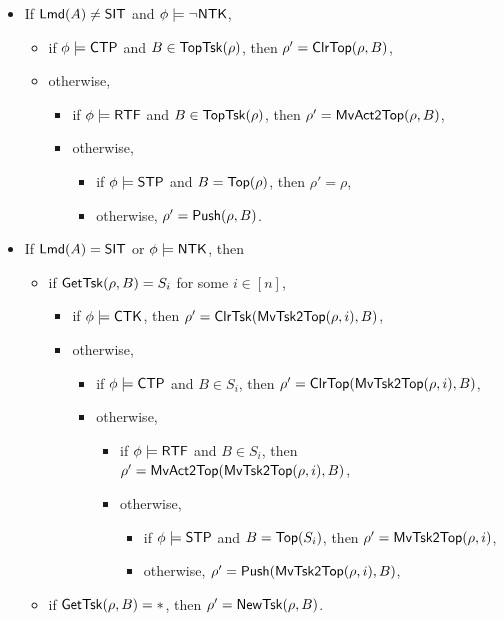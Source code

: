 \medskip

\noindent {}
\begin{itemize}
	\item If ${\sf Lmd}(A) \neq {\sf SIT}$ and $\phi \models \neg {\sf NTK}$, 
	\begin{itemize}
        \item if $\phi \models{\sf CTP}$ and $B \in \mathsf{TopTsk}(\rho)$, then $\rho' =\mathsf{ClrTop}(\rho, B)$,
		\item otherwise,
		\begin{itemize}
			\item if $\phi \models {\sf RTF}$ and $B \in \mathsf{TopTsk}(\rho)$, then $\rho'=\mathsf{MvAct2Top}(\rho, B)$,
			\item otherwise,
			\begin{itemize}
				\item if $\phi \models {\sf STP}$ and $B = \mathsf{Top}(\rho)$, then $\rho' = \rho$,
				\item otherwise, $\rho' = \mathsf{Push}(\rho, B)$.
			\end{itemize}
		\end{itemize}
	\end{itemize}
	\item If ${\sf Lmd}(A) = {\sf SIT}$ or $\phi \models {\sf NTK}$, then
	\begin{itemize}
		\item if $\mathsf{GetTsk}(\rho, B) = S_i$ for some $i\in[n]$,
		\begin{itemize}
            \item if $\phi \models{\sf CTK}$, then $\rho' = \mathsf{ClrTsk}(\mathsf{MvTsk2Top}(\rho, i), B)$,
			\item otherwise, 
			\begin{itemize}
				\item if $\phi \models{\sf CTP}$ and $B \in S_i$, then $\rho' =\mathsf{ClrTop}(\mathsf{MvTsk2Top}(\rho, i), B)$,
				\item otherwise,
				\begin{itemize}
					\item if $\phi \models {\sf RTF}$ and $B \in S_i$, then $\rho'=\mathsf{MvAct2Top}(\mathsf{MvTsk2Top}(\rho, i), B)$,
					\item otherwise,
					\begin{itemize}
						\item if $\phi \models {\sf STP}$ and $B = \mathsf{Top}(S_i)$, then $\rho' = \mathsf{MvTsk2Top}(\rho, i)$,
						\item otherwise, $\rho'=\mathsf{Push}(\mathsf{MvTsk2Top}(\rho, i), B)$,
					\end{itemize}
				\end{itemize}
			\end{itemize}
		\end{itemize}
		\item if $\mathsf{GetTsk}(\rho, B) = *$, then $\rho' = \mathsf{NewTsk}(\rho, B)$.
	\end{itemize}
\end{itemize}


